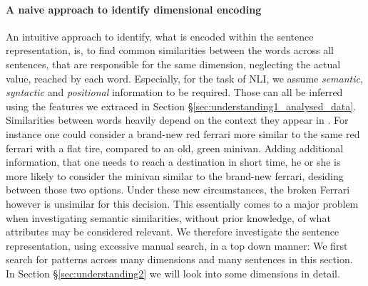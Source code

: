 \paragraph*{A naive approach to identify dimensional encoding}
An intuitive approach to identify, what is encoded within the sentence representation, is, to find common similarities between the words across all sentences, that are responsible for the same dimension, neglecting the actual value, reached by each word. Especially, for the task of \ac{NLI}, we assume \textit{semantic}, \textit{syntactic} and \textit{positional} information to be required. Those can all be inferred using the features we extraced in Section §\ref{sec:understanding1_analysed_data}. Similarities between words heavily depend on the context they appear in \citep{dagan2000contextual}. For instance one could consider a brand-new red ferrari more similar to the same red ferrari with a flat tire, compared to an old, green minivan. Adding additional information, that one needs to reach a destination in short time, he or she is more likely to consider the minivan similar to the brand-new ferrari, desiding between those two options. Under these new circumstances, the broken Ferrari however is unsimilar for this decision. This essentially comes to a major problem when investigating semantic similarities, without prior knowledge, of what attributes may be considered relevant. We therefore investigate the sentence representation, using excessive manual search, in a top down manner: We first search for patterns across many dimensions and many sentences in this section. In Section §\ref{sec:understanding2} we will look into some dimensions in detail.

